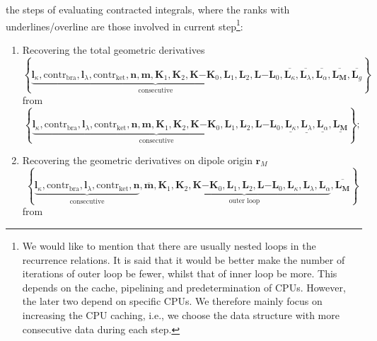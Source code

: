 \documentclass[a4paper,11pt,twoside,openright]{book}
\begin{document}
the steps of evaluating contracted integrals, where the ranks with underlines/overline are those
involved in current step\footnote{We would like to mention that there are usually nested loops
in the recurrence relations. It is said that it would be better make the number of iterations of outer
loop be fewer, whilst that of inner loop be more. This depends on the cache, pipelining and
predetermination of CPUs. However, the later two depend on specific CPUs. We therefore mainly
focus on increasing the CPU caching, i.e., we choose the data structure with more consecutive
data during each step.}:
\begin{enumerate}
  \item Recovering the total geometric derivatives
    \[
      \left\{\underbrace{\boldsymbol{l}_{\kappa},\text{contr}_{\text{bra}},%
      \boldsymbol{l}_{\lambda},\text{contr}_{\text{ket}},\boldsymbol{n},\boldsymbol{m},
      \boldsymbol{K}_{1},\boldsymbol{K}_{2},\boldsymbol{K}\mathrm{-}\boldsymbol{K}_{0},%
      \boldsymbol{L}_{1},\boldsymbol{L}_{2},\boldsymbol{L}\mathrm{-}\boldsymbol{L}_{0}}_{\text{consecutive}},%
      \overline{\boldsymbol{L}_{\kappa}},\overline{\boldsymbol{L}_{\lambda}},%
      \overline{\boldsymbol{L}_{\alpha}},\overline{\boldsymbol{L}_{\boldsymbol{M}}},%
      \overline{\boldsymbol{L}_{g}}\right\}
    \]
    from
    \[
      \left\{\underbrace{\boldsymbol{l}_{\kappa},\text{contr}_{\text{bra}},%
      \boldsymbol{l}_{\lambda},\text{contr}_{\text{ket}},\boldsymbol{n},\boldsymbol{m},
      \boldsymbol{K}_{1},\boldsymbol{K}_{2},\boldsymbol{K}\mathrm{-}\boldsymbol{K}_{0},%
      \boldsymbol{L}_{1},\boldsymbol{L}_{2},\boldsymbol{L}\mathrm{-}\boldsymbol{L}_{0}}_{\text{consecutive}},%
      \underline{\boldsymbol{L}_{\kappa}},\underline{\boldsymbol{L}_{\lambda}},%
      \underline{\boldsymbol{L}_{\alpha}},\underline{\boldsymbol{L}_{\boldsymbol{M}}}\right\};
    \]
%
  \item Recovering the geometric derivatives on dipole origin $\boldsymbol{r}_{M}$
    \[
      \left\{\underbrace{\boldsymbol{l}_{\kappa},\text{contr}_{\text{bra}},\boldsymbol{l}_{\lambda},%
      \text{contr}_{\text{ket}},\boldsymbol{n}}_{\text{consecutive}},\overline{\boldsymbol{m}},%
      \underbrace{\boldsymbol{K}_{1},\boldsymbol{K}_{2},\boldsymbol{K}\mathrm{-}\boldsymbol{K}_{0},%
      \boldsymbol{L}_{1},\boldsymbol{L}_{2},\boldsymbol{L}\mathrm{-}\boldsymbol{L}_{0},%
      \boldsymbol{L}_{\kappa},\boldsymbol{L}_{\lambda},\boldsymbol{L}_{\alpha}}_{\text{outer loop}},
      \overline{\boldsymbol{L}_{\boldsymbol{M}}}\right\}
    \]
    from
    \[
\]
\end{enumerate}
\end{document}
